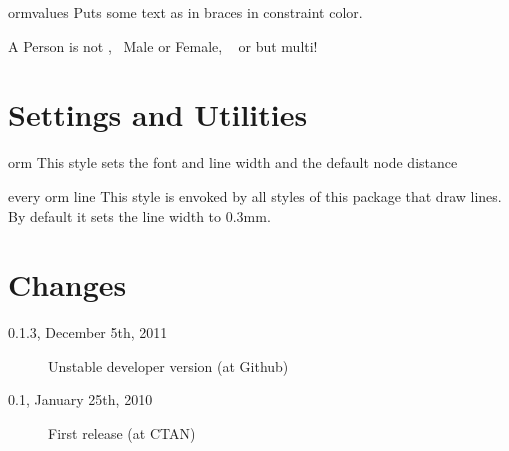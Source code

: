 \documentclass[a4paper,10pt]{article}
\def\ormVersion{0.1.3}
\def\ormDate{December 5th, 2011}
\newif\ifappendix
\begin{document}
\begin{command}{ormvalues}
Puts some text as  in braces in constraint color.
\end{command}

\begin{codeexample}[]
A {\ormtext Person} is not ,~
{\ormc Male} {\ormbf or} {\ormtext Female}, ~
{\ormbf or}  but multi!
\end{codeexample}


\section{Settings and Utilities}
\label{sec:generalstyles}

\begin{stylekey}{orm}
  This style sets the font and line width and the default node distance
\end{stylekey}

\begin{stylekey}{every orm line}
  This style is envoked by all styles of this package that draw lines. By default it sets the line width to 0.3mm.
\end{stylekey}



\section*{Changes}

\begin{description}
  \item[\ormVersion, \ormDate]
    Unstable developer version (at Github)
  \item[0.1, January 25th, 2010]
    First release (at CTAN)
\end{description}

\ifappendix
  
  \addcontentsline{toc}{section}{References and Index}
  
  \printindex
\fi
\end{document}
